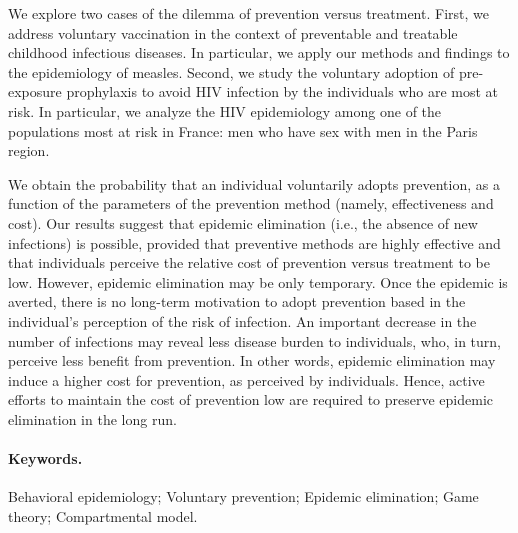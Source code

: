 We explore two cases of the dilemma of prevention versus treatment. First, we address voluntary vaccination in the context of preventable and treatable childhood infectious diseases. In particular, we apply our methods and findings to the epidemiology of measles. 
Second, we study the voluntary adoption of pre-exposure prophylaxis to avoid HIV infection by the individuals who are most at risk. In particular, we analyze the HIV epidemiology among one of the populations most at risk in France: men who have sex with men in the Paris region.



We obtain the probability that an individual voluntarily adopts prevention, as a function of the parameters of the prevention method (namely, effectiveness and cost). Our results suggest that epidemic elimination (i.e., the absence of new infections) is possible, provided that preventive methods are highly effective and that individuals perceive the relative cost of prevention versus treatment to be low.
%
However, epidemic elimination may be only temporary. Once the epidemic is averted, there is no long-term motivation to adopt prevention based in the individual's perception of the risk of infection. An important decrease in the number of infections may reveal  less disease burden to individuals, who, in turn, perceive less benefit from prevention. In other words, epidemic elimination may induce a higher cost for prevention, as perceived by individuals. Hence, active efforts to maintain the cost of prevention low are required to preserve epidemic elimination in the long run.\\

\paragraph{Keywords.} Behavioral epidemiology; Voluntary prevention; Epidemic elimination; Game theory; Compartmental model.

